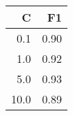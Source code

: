 \begin{tabular}{rr}
\toprule
   C &   F1 \\
\midrule
 0.1 & 0.90 \\
 1.0 & 0.92 \\
 5.0 & 0.93 \\
10.0 & 0.89 \\
\bottomrule
\end{tabular}
